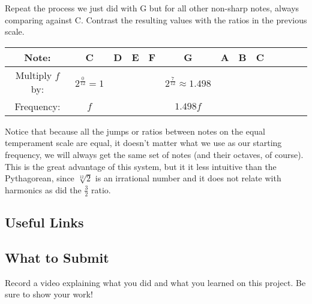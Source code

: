 \documentclass[12pt,noauthor,nooutcomes,hints,instructornotes]{ximera}%
\begin{document}
\begin{question} Repeat the process we just did with G but for all other non-sharp notes, always comparing against C. Contrast the resulting values with the ratios in the previous scale.\\
\begin{center}
\renewcommand{\arraystretch}{3}
\begin{tabular}{|c|c|c|c|c|c|c|c|c|c|c|c|c|}\hline
Note: & C & \hspace{0.15in} D \hspace{0.15in} & \hspace{0.15in} E \hspace{0.15in} & \hspace{0.15in} F \hspace{0.15in} & \hspace{0.15in} G \hspace{0.15in} & \hspace{0.15in} A \hspace{0.15in} & \hspace{0.15in} B \hspace{0.15in} & \hspace{0.15in} C \hspace{0.15in}    \\\hline
\footnotesize{Multiply $f$ by:} & $2^{\frac{0}{12}}=1$ & & & & $2^{\frac{7}{12}} \approx 1.498$ & & &  \\\hline
\footnotesize{Frequency:} & $f$ & & & & $1.498f$ & & &  \\\hline
\end{tabular}
\end{center}
\end{question} 

Notice that because all the jumps or ratios between notes on the equal temperament scale are equal, it doesn't matter what we use as our starting frequency, we will always get the same set of notes (and their octaves, of course). This is the great advantage of this system, but it it less intuitive than the Pythagorean, since $\sqrt[12]{2}$ is an irrational number and it does not relate with harmonics as did the $\frac{3}{2}$ ratio.



\subsection{Useful Links}



\subsection{What to Submit}
Record a video explaining what you did and what you learned on this project. Be sure to show your work!
\end{document}
